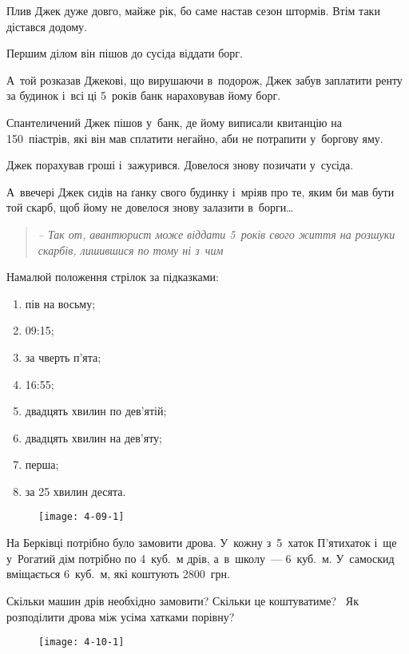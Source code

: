 Плив Джек дуже довго, майже рік, бо саме настав сезон штормів.
Втім таки дістався додому.

Першим ділом він пішов до сусіда віддати борг.

А~той розказав Джекові, що вирушаючи в~подорож, Джек забув заплатити
ренту за будинок і~всі ці 5~років банк нараховував йому борг.

Спантеличений Джек пішов у~банк, де йому виписали квитанцію на 150~піастрів,
які він мав сплатити негайно, аби не потрапити у~боргову яму.

Джек порахував гроші і~зажурився. Довелося знову позичати у~сусіда.

А~ввечері Джек сидів на ґанку свого будинку і~мріяв про те,
яким би мав бути той скарб, щоб йому не довелося знову залазити в~борги\ldots

\begin{quote}
    \itshape
    -- Так от, авантюрист може віддати 5~років свого життя
    на розшуки скарбів, лишившися по тому ні з~чим \smiley
\end{quote}


\problem
Намалюй положення стрілок за підказками:
\begin{enumerate}
    \item пів на восьму;
    \item 09:15;
    \item за чверть п’ята;
    \item 16:55;
    \item двадцять хвилин по дев’ятій;
    \item двадцять хвилин на дев’яту;
    \item перша;
    \item за 25 хвилин десята.
\end{enumerate}

\begin{figure}[h]
    \centering
    \texttt{[image: 4-09-1]}
\end{figure}


\problem
На Берківці потрібно було замовити дрова.
У~кожну з~5~хаток П'ятихаток і~ще у~Рогатий дім потрібно по 4~куб.~м дрів,
а~в~школу~--- 6~куб.~м.
У~самоскид вміщається 6~куб.~м, які коштують 2800~грн.

Скільки машин дрів необхідно замовити? Скільки це коштуватиме? 
Як розподілити дрова між усіма хатками порівну?

\begin{figure}[h]
    \centering
    \texttt{[image: 4-10-1]}
\end{figure}

